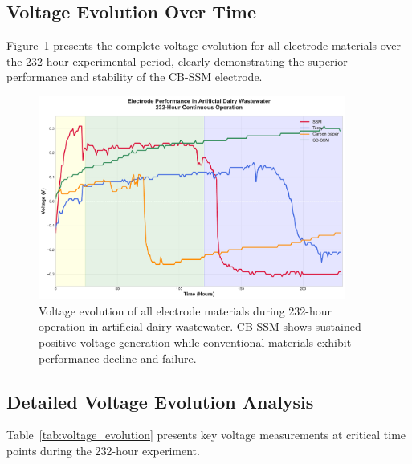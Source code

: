 \documentclass[12pt,a4paper]{article}
\begin{document}
\subsection{Voltage Evolution Over Time}

Figure~\ref{fig:voltage_evolution} presents the complete voltage evolution for all electrode materials over the 232-hour experimental period, clearly demonstrating the superior performance and stability of the CB-SSM electrode.

\begin{figure}[H]
\centering
\includegraphics[width=0.9\textwidth]{voltage_evolution.pdf}
\caption{Voltage evolution of all electrode materials during 232-hour operation in artificial dairy wastewater. CB-SSM shows sustained positive voltage generation while conventional materials exhibit performance decline and failure.}
\label{fig:voltage_evolution}
\end{figure}

\subsection{Detailed Voltage Evolution Analysis}

Table~\ref{tab:voltage_evolution} presents key voltage measurements at critical time points during the 232-hour experiment.
\end{document}
